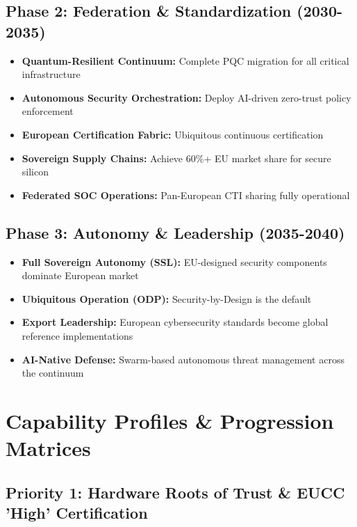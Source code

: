 \documentclass[12pt,a4paper]{report}
\begin{document}
\subsection*{Phase 2: Federation \& Standardization (2030-2035)}
\begin{itemize}
    \item \textbf{Quantum-Resilient Continuum:} Complete PQC migration for all critical infrastructure
    \item \textbf{Autonomous Security Orchestration:} Deploy AI-driven zero-trust policy enforcement
    \item \textbf{European Certification Fabric:} Ubiquitous continuous certification
    \item \textbf{Sovereign Supply Chains:} Achieve 60\%+ EU market share for secure silicon
    \item \textbf{Federated SOC Operations:} Pan-European CTI sharing fully operational
\end{itemize}

\subsection*{Phase 3: Autonomy \& Leadership (2035-2040)}
\begin{itemize}
    \item \textbf{Full Sovereign Autonomy (SSL):} EU-designed security components dominate European market
    \item \textbf{Ubiquitous Operation (ODP):} Security-by-Design is the default
    \item \textbf{Export Leadership:} European cybersecurity standards become global reference implementations
    \item \textbf{AI-Native Defense:} Swarm-based autonomous threat management across the continuum
\end{itemize}

\newpage
\section{Capability Profiles \& Progression Matrices}

\subsection*{Priority 1: Hardware Roots of Trust \& EUCC 'High' Certification}
\end{document}
